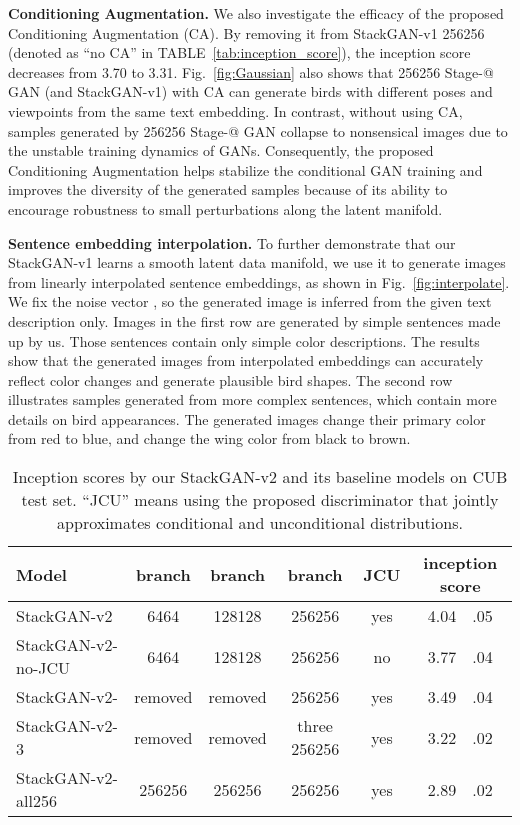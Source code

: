 \documentclass[10pt,journal,letterpaper,compsoc]{IEEEtran}
\makeatletter
\newcommand{\Rmnum}[1]{\expandafter\@slowromancap\romannumeral #1@}
\makeatother
\begin{document}
\textbf{Conditioning Augmentation.}
{
We also investigate the efficacy of the proposed Conditioning Augmentation (CA). By removing it from StackGAN-v1 256256 (denoted as ``no CA'' in TABLE~\ref{tab:inception_score}), the inception score decreases from 3.70 to 3.31. Fig.~\ref{fig:Gaussian} also shows that 256256 Stage-\Rmnum{1} GAN (and StackGAN-v1) with CA can generate birds with different poses and viewpoints from the same text embedding. In contrast, without using CA, samples generated by 256256 Stage-\Rmnum{1} GAN collapse to nonsensical images due to the unstable training dynamics of GANs. Consequently, the proposed Conditioning Augmentation helps stabilize the conditional GAN training and improves the diversity of the generated samples because of its ability to encourage robustness to small perturbations along the latent manifold. 
}



\textbf{Sentence embedding interpolation. }
{
To further demonstrate that our StackGAN-v1 learns a smooth latent data manifold, we use it to generate images from linearly interpolated sentence embeddings, as shown in Fig.~\ref{fig:interpolate}. We fix the noise vector , so the generated image is inferred from the given text description only. Images in the first row are generated by simple sentences made up by us. Those sentences contain only simple color descriptions. The results show that the generated images from interpolated embeddings can accurately reflect color changes and generate plausible bird shapes. The second row illustrates samples generated from more complex sentences, which contain more details on bird appearances. The generated images change their primary color from red to blue, and change the wing color from black to brown.
}


\begin{table*}[bt]
\begin{center}
\normalfont
\begin{tabular}{|l|c|c|c|c|c|}
\hline
Model &branch  &branch  &branch   &JCU  & inception score\\
\hline
StackGAN-v2&6464 &128128 &256256   &yes  &4.04~~.05\\
\hline
StackGAN-v2-no-JCU     &6464 &128128 &256256  &no   &3.77~~.04\\
\hline
StackGAN-v2-   &removed &removed &256256  &yes &3.49~~.04\\
\hline
StackGAN-v2-3   &removed &removed &three 256256  &yes &3.22~~.02\\
\hline
StackGAN-v2-all256 &256256 &256256 &256256    &yes    &2.89~~.02\\
\hline
\end{tabular}
\end{center}
\caption{Inception scores by our StackGAN-v2 and its baseline models on CUB test set. ``JCU'' means using the proposed discriminator that jointly approximates conditional and unconditional distributions.}
\vspace{-5pt}
\label{tab:baseline} 
\end{table*}
\end{document}
